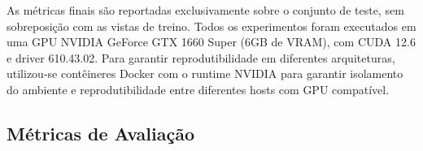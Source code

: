 \documentclass[12pt]{article}
\begin{document}
\begin{table}[H]
  \centering
\caption{Impacto da estratégia de seleção de vistas de treino (\textit{uniform} vs.\ \textit{random}) sobre a qualidade visual média no dataset LLFF, avaliado no regime TTA com $N=10$ vistas. Resultados reportado sobre a cena \textit{fern}.}
\label{tab:split}
\end{table}

As métricas finais são reportadas exclusivamente sobre o conjunto de teste, sem sobreposição com as vistas de treino. Todos os experimentos foram executados em uma GPU NVIDIA GeForce GTX 1660 Super (6GB de VRAM), com CUDA 12.6 e driver 610.43.02.
Para garantir reprodutibilidade em diferentes arquiteturas, utilizou-se contêineres Docker com o runtime NVIDIA para garantir isolamento do ambiente e reprodutibilidade entre diferentes hosts com GPU compatível.


\subsection{Métricas de Avaliação}
\label{sec:metricas}
\end{document}
